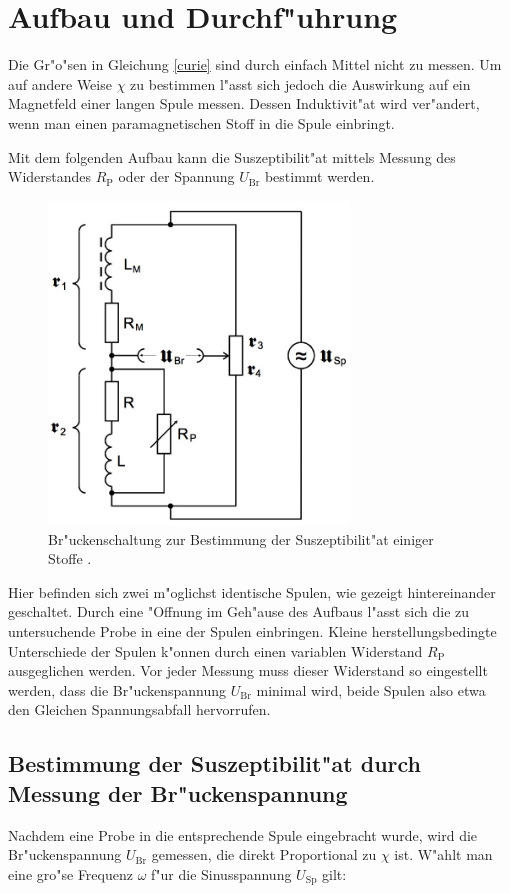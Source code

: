\section{Aufbau und Durchf"uhrung}
	\label{sec:durchfuehrung}

	Die Gr"o"sen in Gleichung \eqref{curie} sind durch einfach Mittel nicht zu messen.
	Um auf andere Weise $\chi$ zu bestimmen l"asst sich jedoch die Auswirkung auf ein Magnetfeld einer langen Spule messen.
	Dessen Induktivit"at wird ver"andert, wenn man einen paramagnetischen Stoff in die Spule einbringt.

	Mit dem folgenden Aufbau kann die Suszeptibilit"at mittels Messung des Widerstandes $R_\mathrm{P}$ oder der Spannung $U_\mathrm{Br}$ bestimmt werden.

	\begin{figure}[h!]
		\centering
		\includegraphics[width = 8cm]{img/aufbau.JPG}
		\caption{Br"uckenschaltung zur Bestimmung der Suszeptibilit"at einiger Stoffe \cite{anleitung}.}
		\label{fig:brueckenschaltung}
	\end{figure}

	\clearpage

	Hier befinden sich zwei m"oglichst identische Spulen, wie gezeigt hintereinander geschaltet.
	Durch eine "Offnung im Geh"ause des Aufbaus l"asst sich die zu untersuchende Probe in eine der Spulen einbringen.
	Kleine herstellungsbedingte Unterschiede der Spulen k"onnen durch einen variablen Widerstand $R_\mathrm{P}$ ausgeglichen werden.
	Vor jeder Messung muss dieser Widerstand so eingestellt werden, dass die Br"uckenspannung $U_\mathrm{Br}$ minimal wird, beide Spulen also etwa den Gleichen Spannungsabfall hervorrufen.

	\subsection{Bestimmung der Suszeptibilit"at durch Messung der Br"uckenspannung}
		\label{subsec:messung_u}
		Nachdem eine Probe in die entsprechende Spule eingebracht wurde, wird die Br"uckenspannung $U_\mathrm{Br}$ gemessen, die direkt Proportional zu $\chi$ ist.
		W"ahlt man eine gro"se Frequenz $\omega$ f"ur die Sinusspannung $U_\mathrm{Sp}$ gilt:

